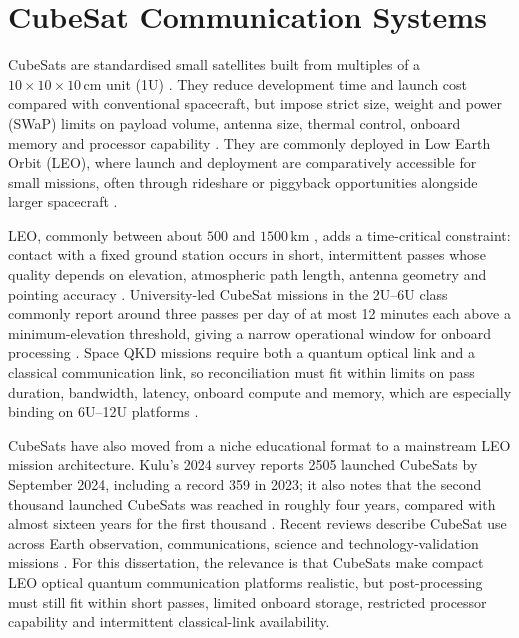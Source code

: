 \documentclass{UoYCSproject}
\begin{document}
\section{CubeSat Communication Systems}
\label{sec:bg-cubesat}

CubeSats are standardised small satellites built from multiples of a
$10 \times 10 \times 10\,\text{cm}$ unit (1U) \cite{oi_cubesat_2017}. They
reduce development time and launch cost compared with conventional spacecraft,
but impose strict size, weight and power (SWaP) limits on payload volume,
antenna size, thermal control, onboard memory and processor capability
\cite{oi_cubesat_2017, sivasankaran_cubesat_2022, bouzoukis_overview_2025}.
They are commonly deployed in Low Earth Orbit (LEO), where launch and
deployment are comparatively accessible for small missions, often through
rideshare or piggyback opportunities alongside larger spacecraft
\cite{woellert_cubesats_2011, nieto-peroy_cubesat_2019}.

LEO, commonly between about $500$ and $1500$\,km
\cite{Maral_LEO_1991}, adds a time-critical constraint: contact with a fixed
ground station occurs in short, intermittent passes whose quality depends on
elevation, atmospheric path length, antenna geometry and pointing accuracy
\cite{oi_cubesat_2017, jordan-parra_evaluation_2024}. University-led CubeSat
missions in the 2U--6U class commonly report around three passes per day of at
most 12 minutes each above a minimum-elevation threshold, giving a narrow
operational window for onboard processing \cite{nieto-peroy_cubesat_2019}.
Space QKD missions require both a quantum optical link and a classical
communication link, so reconciliation must fit within limits on pass duration,
bandwidth, latency, onboard compute and memory, which are especially binding on
6U--12U platforms \cite{simmons_hogs_2025}.

CubeSats have also moved from a niche educational format to a mainstream LEO
mission architecture. Kulu's 2024 survey reports 2505 launched CubeSats by
September 2024, including a record 359 in 2023; it also notes that the second
thousand launched CubeSats was reached in roughly four years, compared with
almost sixteen years for the first thousand \cite{kulu_cubesats_2024}. Recent
reviews describe CubeSat use across Earth observation, communications, science
and technology-validation missions \cite{bouzoukis_overview_2025}. For this
dissertation, the relevance is that CubeSats make compact LEO optical quantum
communication platforms realistic, but post-processing must still fit within
short passes, limited onboard storage, restricted processor capability and
intermittent classical-link availability.
\end{document}
